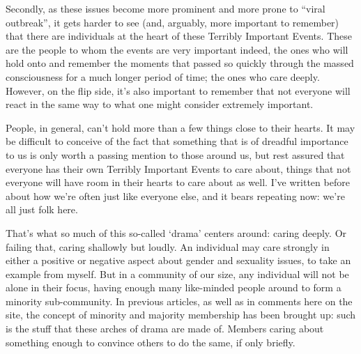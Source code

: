 Secondly, as these issues become more prominent and more prone to ``viral outbreak'', it gets harder to see (and, arguably, more important to remember) that there are individuals at the heart of these Terribly Important Events.  These are the people to whom the events are very important indeed, the ones who will hold onto and remember the moments that passed so quickly through the massed consciousness for a much longer period of time; the ones who care deeply.  However, on the flip side, it's also important to remember that not everyone will react in the same way to what one might consider extremely important.

People, in general, can't hold more than a few things close to their hearts.  It may be difficult to conceive of the fact that something that is of dreadful importance to us is only worth a passing mention to those around us, but rest assured that everyone has their own Terribly Important Events to care about, things that not everyone will have room in their hearts to care about as well.  I've written before about how we're often just like everyone else, and it bears repeating now: we're all just folk here.

That's what so much of this so-called ‘drama' centers around: caring deeply.  Or failing that, caring shallowly but loudly.  An individual may care strongly in either a positive or negative aspect about gender and sexuality issues, to take an example from myself.  But in a community of our size, any individual will not be alone in their focus, having enough many like-minded people around to form a minority sub-community.  In previous articles, as well as in comments here on the site, the concept of minority and majority membership has been brought up: such is the stuff that these arches of drama are made of.  Members caring about something enough to convince others to do the same, if only briefly.
